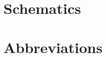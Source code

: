 \appendix
\section{Schematics}
\label{sec:schematics}

\newpage

\section{Abbreviations}
\label{sec:abbreviations}
 \newpage

